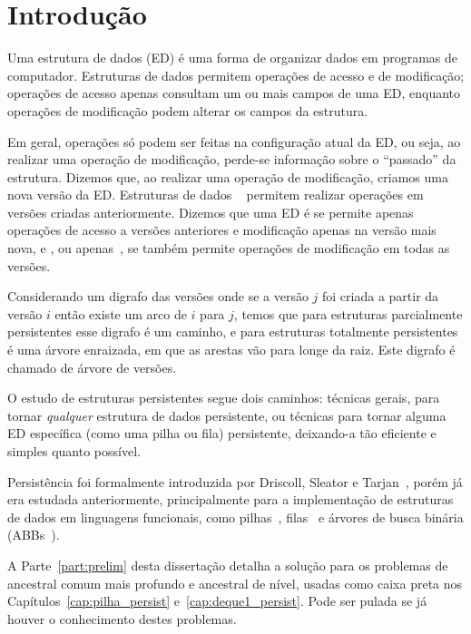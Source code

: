 \documentclass[main.tex]{subfiles}
\begin{document}
\setcounter{secnumdepth}{0}

\chapter*{Introdução}

Uma estrutura de dados (ED) é uma forma de organizar dados em programas de computador. Estruturas de dados permitem operações de acesso e de modificação; operações de acesso apenas consultam um ou mais campos de uma ED, enquanto operações de modificação podem alterar os campos da estrutura.

Em geral, operações só podem ser feitas na configuração atual da ED, ou seja, ao realizar uma operação de modificação, perde-se informação sobre o ``passado'' da estrutura. Dizemos que, ao realizar uma operação de modificação, criamos uma nova versão da ED. Estruturas de dados ~\cite{DriscollSST1989} permitem realizar operações em versões criadas anteriormente. Dizemos que uma ED é  se permite apenas operações de acesso a versões anteriores e modificação apenas na versão mais nova, e , ou apenas~, se também permite operações de modificação em todas as versões.

Considerando um digrafo das versões onde se a versão $j$ foi criada a partir da versão $i$ então existe um arco de $i$ para $j$, temos que para estruturas parcialmente persistentes esse digrafo é um caminho, e para estruturas totalmente persistentes é uma árvore enraizada, em que as arestas vão para longe da raiz. Este digrafo é chamado de árvore de versões.

O estudo de estruturas persistentes segue dois caminhos: técnicas gerais, para tornar \emph{qualquer} estrutura de dados persistente, ou técnicas para tornar alguma ED específica (como uma pilha ou fila) persistente, deixando-a tão eficiente e simples quanto possível.

Persistência foi formalmente introduzida por Driscoll, Sleator e Tarjan~\cite{DriscollSST1989}, porém já era estudada anteriormente, principalmente para a implementação de estruturas de dados em linguagens funcionais, como pilhas~\cite{Myers83}, filas~\cite{HoodMelville} e árvores de busca binária (ABBs~\cite{Myers82}).

A Parte~\ref{part:prelim} desta dissertação detalha a solução para os problemas de ancestral comum mais profundo e ancestral de nível, usadas como caixa preta nos Capítulos~\ref{cap:pilha_persist} e~\ref{cap:deque1_persist}. Pode ser pulada se já houver o conhecimento destes problemas.
\end{document}
